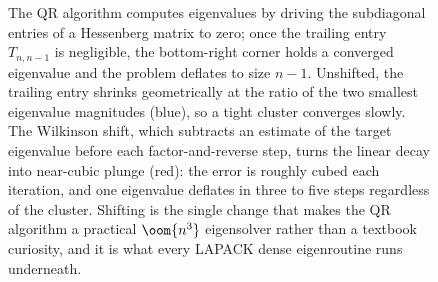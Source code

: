 \begin{figure}[htbp]
\centering
{}
\caption[Subdiagonal decay in the shifted QR algorithm]{The QR
algorithm computes eigenvalues by driving the subdiagonal entries of a
Hessenberg matrix to zero; once the trailing entry $T_{n,n-1}$ is
negligible, the bottom-right corner holds a converged eigenvalue and
the problem deflates to size $n-1$. Unshifted, the trailing entry
shrinks geometrically at the ratio of the two smallest eigenvalue
magnitudes (blue), so a tight cluster converges slowly. The Wilkinson
shift, which subtracts an estimate of the target eigenvalue before each
factor-and-reverse step, turns the linear decay into near-cubic
plunge (red): the error is roughly cubed each iteration, and one
eigenvalue deflates in three to five steps regardless of the cluster.
Shifting is the single change that makes the QR algorithm a practical
$\oom{n^{3}}$ eigensolver rather than a textbook curiosity, and it is
what every LAPACK dense eigenroutine runs underneath.}
\label{fig:vol02:ch10:qr-convergence}
\end{figure}
